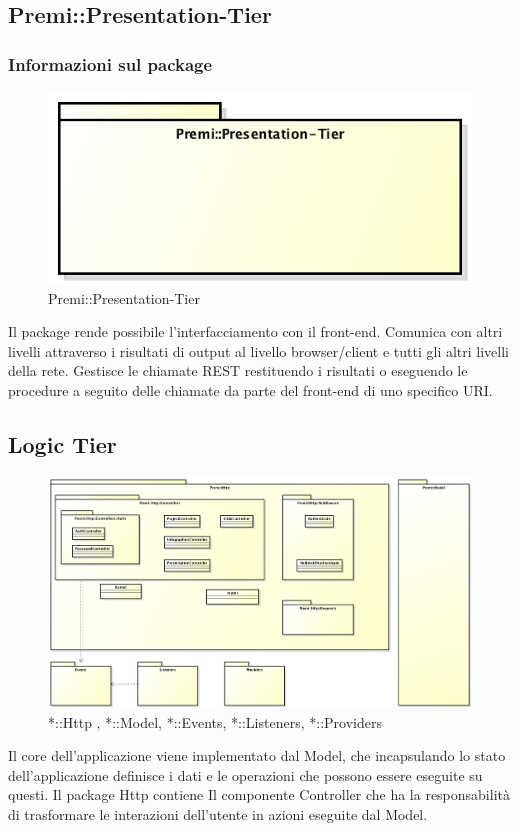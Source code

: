 \newpage

\subsection{Premi::Presentation-Tier}
	\subsubsection*{Informazioni sul package}
		\begin{figure}[h]
			\centering
			\includegraphics[width=0.5\linewidth]{img/premi_presentation-tier}
			\caption[Premi::Presentation-Tier]{Premi::Presentation-Tier}
		\end{figure}
		Il package rende possibile l'interfacciamento con il \gls{front-end}. Comunica con altri livelli attraverso i risultati di output al livello browser/client e tutti gli altri livelli della rete.
		Gestisce le chiamate \gls{REST} restituendo i risultati o eseguendo le procedure a seguito delle chiamate da parte del \gls{front-end} di uno specifico \gls{URI}. 
		
\newpage
		
\subsection{Logic Tier}
	\begin{figure}[h]
		\centering
		\includegraphics[width=\linewidth]{img/back-end_logic-tier_package}
		\caption[*::Http , *::Model, *::Events, *::Listeners, *::Providers]{*::Http , *::Model, *::Events, *::Listeners, *::Providers}
	\end{figure}
	Il core dell'applicazione viene implementato dal Model, che incapsulando lo stato dell'applicazione definisce i dati e le operazioni che possono essere eseguite su questi. Il package Http contiene Il componente Controller che ha la responsabilità di trasformare le interazioni dell'utente in azioni eseguite dal Model.
	
